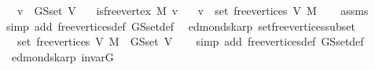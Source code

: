 \begin{isabellebody}
\ \ \ {\isachardoublequoteopen}v\ {\isasymin}\ G{\isachardot}{\kern0pt}S{\isachardot}{\kern0pt}set\ V{\isachardoublequoteclose}\isanewline
\ \ \ {\isachardoublequoteopen}is{\isacharunderscore}{\kern0pt}free{\isacharunderscore}{\kern0pt}vertex\ M\ v{\isachardoublequoteclose}\isanewline
\ \ \ {\isachardoublequoteopen}v\ {\isasymin}\ set\ {\isacharparenleft}{\kern0pt}free{\isacharunderscore}{\kern0pt}vertices\ V\ M{\isacharparenright}{\kern0pt}{\isachardoublequoteclose}%
\endisataginvisible
{\isafoldinvisible}%
%
\isadeliminvisible
\isanewline
%
\endisadeliminvisible
%
\isadelimproof
\ \ %
\endisadelimproof
%
\isatagproof
{}\isamarkupfalse%
\ assms\isanewline
\ \ \isamarkupfalse%
\ {\isacharparenleft}{\kern0pt}simp\ add{\isacharcolon}{\kern0pt}\ free{\isacharunderscore}{\kern0pt}vertices{\isacharunderscore}{\kern0pt}def\ G{\isachardot}{\kern0pt}S{\isachardot}{\kern0pt}set{\isacharunderscore}{\kern0pt}def{\isacharparenright}{\kern0pt}%
\endisatagproof
{\isafoldproof}%
%
\isadelimproof
\isanewline
%
\endisadelimproof
%
\isadeliminvisible
\isanewline
%
\endisadeliminvisible
%
\isataginvisible
{}\isamarkupfalse%
\ {\isacharparenleft}{\kern0pt}\ edmonds{\isacharunderscore}{\kern0pt}karp{\isacharparenright}{\kern0pt}\ set{\isacharunderscore}{\kern0pt}free{\isacharunderscore}{\kern0pt}vertices{\isacharunderscore}{\kern0pt}subset{\isacharcolon}{\kern0pt}\isanewline
\ \ \ {\isachardoublequoteopen}set\ {\isacharparenleft}{\kern0pt}free{\isacharunderscore}{\kern0pt}vertices\ V\ M{\isacharparenright}{\kern0pt}\ {\isasymsubseteq}\ G{\isachardot}{\kern0pt}S{\isachardot}{\kern0pt}set\ V{\isachardoublequoteclose}%
\endisataginvisible
{\isafoldinvisible}%
%
\isadeliminvisible
\isanewline
%
\endisadeliminvisible
%
\isadelimproof
\ \ %
\endisadelimproof
%
\isatagproof
{}\isamarkupfalse%
\ {\isacharparenleft}{\kern0pt}simp\ add{\isacharcolon}{\kern0pt}\ free{\isacharunderscore}{\kern0pt}vertices{\isacharunderscore}{\kern0pt}def\ G{\isachardot}{\kern0pt}S{\isachardot}{\kern0pt}set{\isacharunderscore}{\kern0pt}def{\isacharparenright}{\kern0pt}%
\endisatagproof
{\isafoldproof}%
%
\isadelimproof
\isanewline
%
\endisadelimproof
%
\isadeliminvisible
\isanewline
%
\endisadeliminvisible
%
\isataginvisible
{}\isamarkupfalse%
\ {\isacharparenleft}{\kern0pt}\ edmonds{\isacharunderscore}{\kern0pt}karp{\isacharparenright}{\kern0pt}\ invar{\isacharunderscore}{\kern0pt}G{}{\isacharunderscore}{\kern0pt}{}{\isacharcolon}{\kern0pt}\isanewline

\end{isabellebody}
